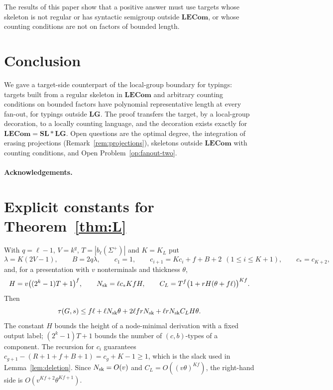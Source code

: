 \documentclass[11pt]{article}
\numberwithin{equation}{section}
\theoremstyle{plain}
\theoremstyle{definition}
\theoremstyle{remark}
\theoremstyle{plain}
\newcommand{\LG}{\mathbf{LG}}
\newcommand{\SL}{\mathbf{SL}}
\newcommand{\LECom}{\mathbf{L}\mathbf{ECom}}
\newcommand{\Kocc}{K_L}
\begin{document}
The results of this paper show that a positive answer must use targets whose
skeleton is not regular or has syntactic semigroup outside $\LECom$, or whose
counting conditions are not on factors of bounded length.

\section{Conclusion}
\label{sec:conclusion}

We gave a target-side counterpart of the local-group boundary for typings:
targets built from a regular skeleton in $\LECom$ and arbitrary counting
conditions on bounded factors have polynomial representative length at every
fan-out, for typings outside $\LG$.  The proof transfers the target, by a
local-group decoration, to a locally counting language, and the decoration exists
exactly for $\LECom=\SL*\LG$.  Open questions are the optimal degree, the
integration of erasing projections (Remark~\ref{rem:projections}), skeletons
outside $\LECom$ with counting conditions, and Open Problem~\ref{op:fanout-two}.

\paragraph{Acknowledgements.}

\appendix
\section{Explicit constants for Theorem~\ref{thm:L}}
\label{app:constants}

With $q=\ell-1$, $V=k^q$, $T=|b_\ell(\Sigma^+)|$ and $K=\Kocc$ put
\[
 \lambda=K(2V-1),\qquad B=2q\lambda,\qquad c_1=1,\qquad
 c_{i+1}=Kc_i+f+B+2\ \ (1\le i\le K+1),\qquad c_*=c_{K+2},
\]
and, for a presentation with $v$ nonterminals and thickness $\theta$,
\[
 H=v\bigl((2^k-1)T+1\bigr)^f,\qquad N_{\rm sk}=\ell c_*KfH,\qquad
 C_L=T^f\bigl(1+rH(\theta+f\ell)\bigr)^{Kf}.
\]
Then
\begin{equation}
\label{eq:L-explicit}
 \tau(G,s)\le f\ell+\ell N_{\rm sk}\theta+2\ell frN_{\rm sk}
 +\ell rN_{\rm sk}C_LH\theta .
\end{equation}
The constant $H$ bounds the height of a node-minimal derivation with a fixed
output label; $(2^k-1)T+1$ bounds the number of $(c,b)$-types of a component.
The recursion for $c_i$ guarantees $c_{g+1}-(R+1+f+B+1)=c_g+K-1\ge1$, which is the
slack used in Lemma~\ref{lem:deletion}.  Since $N_{\rm sk}=O(v)$ and
$C_L=O((v\theta)^{Kf})$, the right-hand side is $O(v^{Kf+2}\theta^{Kf+1})$.
\end{document}

